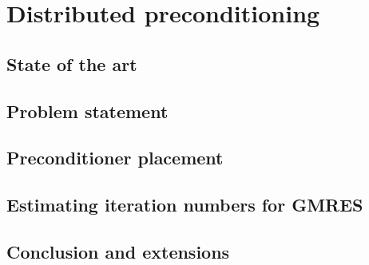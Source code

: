 \chapter{Distributed preconditioning}\label{ch:distributed-preconditioning}



\section{State of the art}\label{sec:precond-introduction}


\section{Problem statement}\label{sec:problem-statement}


\section{Preconditioner placement}\label{sec:preconditioner-placement}


\section{Estimating iteration numbers for GMRES}\label{sec:estimating-m-for-gmres}


\section{Conclusion and extensions}\label{sec:conclusion-precond-placement}


\newpage\null\newpage\null\thispagestyle{empty}
